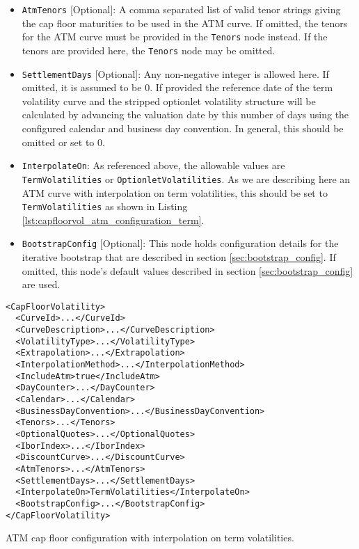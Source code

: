 \begin{itemize}
\item \lstinline!AtmTenors! [Optional]:
A comma separated list of valid tenor strings giving the cap floor maturities to be used in the ATM curve. If omitted, the tenors for the ATM curve must be provided in the \lstinline!Tenors! node instead. If the tenors are provided here, the \lstinline!Tenors! node may be omitted.

\item \lstinline!SettlementDays! [Optional]:
Any non-negative integer is allowed here. If omitted, it is assumed to be 0. If provided the reference date of the term volatility curve and the stripped optionlet volatility structure will be calculated by advancing the valuation date by this number of days using the configured calendar and business day convention. In general, this should be omitted or set to 0.

\item \lstinline!InterpolateOn!:
As referenced above, the allowable values are \lstinline!TermVolatilities! or \lstinline!OptionletVolatilities!. As we are describing here an ATM curve with interpolation on term volatilities, this should be set to \lstinline!TermVolatilities! as shown in Listing \ref{lst:capfloorvol_atm_configuration_term}.

\item \lstinline!BootstrapConfig! [Optional]:
This node holds configuration details for the iterative bootstrap that are described in section \ref{sec:bootstrap_config}. If omitted, this node's default values described in section \ref{sec:bootstrap_config} are used.

\end{itemize}

\begin{longlisting}
\begin{verbatim}
<CapFloorVolatility>
  <CurveId>...</CurveId>
  <CurveDescription>...</CurveDescription>
  <VolatilityType>...</VolatilityType>
  <Extrapolation>...</Extrapolation>
  <InterpolationMethod>...</InterpolationMethod>
  <IncludeAtm>true</IncludeAtm>
  <DayCounter>...</DayCounter>
  <Calendar>...</Calendar>
  <BusinessDayConvention>...</BusinessDayConvention>
  <Tenors>...</Tenors>
  <OptionalQuotes>...</OptionalQuotes>
  <IborIndex>...</IborIndex>
  <DiscountCurve>...</DiscountCurve>
  <AtmTenors>...</AtmTenors>
  <SettlementDays>...</SettlementDays>
  <InterpolateOn>TermVolatilities</InterpolateOn>
  <BootstrapConfig>...</BootstrapConfig>
</CapFloorVolatility>
\end{verbatim}
\caption{ATM cap floor configuration with interpolation on term volatilities.}
\label{lst:capfloorvol_atm_configuration_term}
\end{longlisting}

